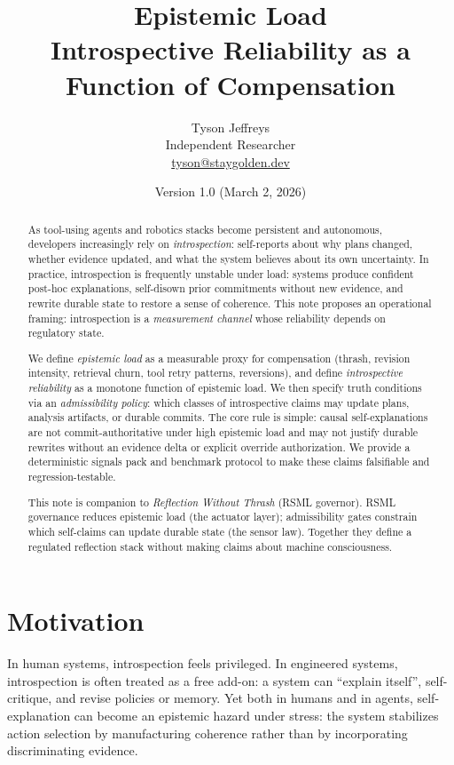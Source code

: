 \documentclass[11pt]{article}
\title{Epistemic Load\\\large Introspective Reliability as a Function of Compensation}
\author{Tyson Jeffreys\\Independent Researcher\\\href{mailto:tyson@staygolden.dev}{tyson@staygolden.dev}}
\date{Version 1.0 \quad (March 2, 2026)}
\begin{document}
\maketitle

\begin{abstract}
As tool-using agents and robotics stacks become persistent and autonomous, developers increasingly rely on
\emph{introspection}: self-reports about why plans changed, whether evidence updated, and what the system
believes about its own uncertainty. In practice, introspection is frequently unstable under load: systems
produce confident post-hoc explanations, self-disown prior commitments without new evidence, and rewrite
durable state to restore a sense of coherence. This note proposes an operational framing: introspection is a
\emph{measurement channel} whose reliability depends on regulatory state.

We define \emph{epistemic load} as a measurable proxy for compensation (thrash, revision intensity, retrieval
churn, tool retry patterns, reversions), and define \emph{introspective reliability} as a monotone function of
epistemic load. We then specify truth conditions via an \emph{admissibility policy}: which classes of
introspective claims may update plans, analysis artifacts, or durable commits. The core rule is simple:
causal self-explanations are not commit-authoritative under high epistemic load and may not justify durable
rewrites without an evidence delta or explicit override authorization. We provide a deterministic signals
pack and benchmark protocol to make these claims falsifiable and regression-testable.

This note is companion to \emph{Reflection Without Thrash} (RSML governor). RSML governance reduces
epistemic load (the actuator layer); admissibility gates constrain which self-claims can update durable state
(the sensor law). Together they define a regulated reflection stack without making claims about machine
consciousness.
\end{abstract}

\section{Motivation}
In human systems, introspection feels privileged. In engineered systems, introspection is often treated as a
free add-on: a system can \enquote{explain itself}, self-critique, and revise policies or memory. Yet both in
humans and in agents, self-explanation can become an epistemic hazard under stress: the system stabilizes
action selection by manufacturing coherence rather than by incorporating discriminating evidence.
\end{document}
